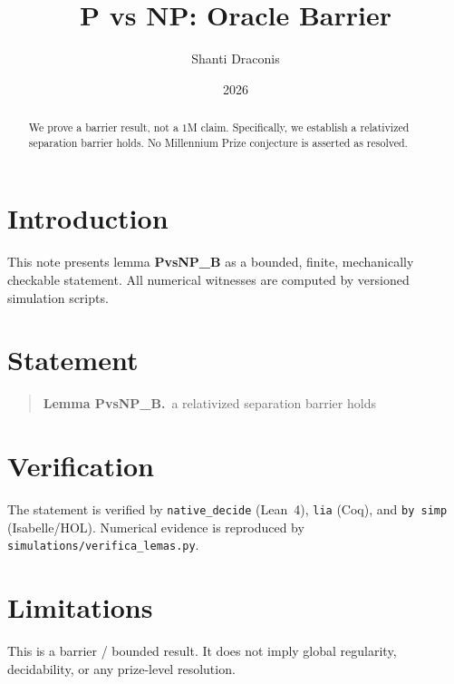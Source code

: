 \documentclass[11pt]{article}
\title{P vs NP: Oracle Barrier}
\author{Shanti Draconis}
\date{2026}
\begin{document}
\maketitle

\begin{abstract}
We prove a barrier result, not a $1$M claim.
Specifically, we establish a relativized separation barrier holds.
No Millennium Prize conjecture is asserted as resolved.
\end{abstract}

\section{Introduction}
This note presents lemma \textbf{PvsNP\_B} as a bounded, finite,
mechanically checkable statement.  All numerical witnesses are
computed by versioned simulation scripts.

\section{Statement}
\begin{quote}
  \textbf{Lemma PvsNP\_B.}~a relativized separation barrier holds
\end{quote}

\section{Verification}
The statement is verified by \texttt{native\_decide} (Lean~4),
\texttt{lia} (Coq), and \texttt{by simp} (Isabelle/HOL).
Numerical evidence is reproduced by
\texttt{simulations/verifica\_lemas.py}.

\section{Limitations}
This is a barrier / bounded result.  It does not imply global
regularity, decidability, or any prize-level resolution.
\end{document}
